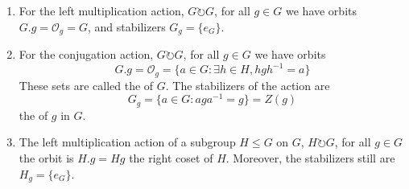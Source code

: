 \begin{example}
        \leavevmode
        \begin{enumerate}
                \item For the left multiplication action, $G \circlearrowright G$, for all $g \in G$ we have orbits $G.g = \mathcal{O}_g = G$, and stabilizers $G_g = \{e_G\}$.
                \item For the conjugation action, $G \circlearrowright G$, for all $g \in G$ we have orbits \begin{equation}
                                G.g = \mathcal{O}_g = \{a \in G:\exists h \in H, hgh^{-1} = a\}
                \end{equation}
                        These sets are called the  of $G$. The stabilizers of the action are \begin{equation}
                                G_g = \{a \in G: aga^{-1} = g\} = Z(g)
                        \end{equation}
                        the  of $g$ in $G$.
                \item The left multiplication action of a subgroup $H \leq G$ on $G$, $H \circlearrowright G$, for all $g \in G$ the orbit is $H.g = Hg$ the right coset of $H$. Moreover, the stabilizers still are $H_g = \{e_G\}$.
        \end{enumerate}
\end{example}

